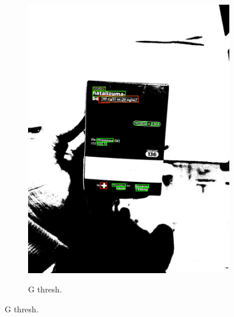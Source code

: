 \begin{figure}[htb]
\begin{subfigure}[t]{0.21\textwidth}
        \includegraphics[width=\linewidth]{../pictures/tysabri_rgb_r_only_thresh_boxes.jpg}
    \end{subfigure}
    \hfill
    \begin{subfigure}[t]{0.21\textwidth}
        \centering
        \caption{G thresh.}
        \label{fig:foto:versoes:1:G_thresh:boxes}

\end{subfigure}
\end{figure}

